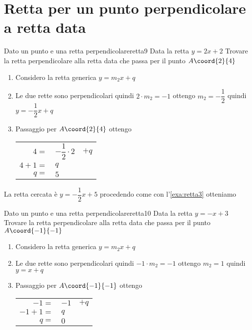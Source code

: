 \section{Retta per un punto perpendicolare a retta data}
\begin{esempiot}{Dato un punto e una retta perpendicolare}{retta9}
	Data la retta $y=2x+2$ Trovare la retta perpendicolare alla retta data che  passa per il punto	$A\coord{2}{4}$
\end{esempiot}
\begin{enumerate}
	\item Considero la retta generica $y=m_2x+q$
	\item Le due rette sono perpendicolari quindi $2\cdot m_2=-1$ ottengo $m_2=-\dfrac{1}{2}$ quindi $y=-\dfrac{1}{2}x+q$
	\item Passaggio per $A\coord{2}{4}$ ottengo 
	\begin{tabular}{rll}
		$4=$&$-\dfrac{1}{2}\cdot 2$&$+q$\\
		$4+1=$&$q$\\
		$q=$&$5$\\
	\end{tabular}
\end{enumerate}

La retta cercata è $y=-\dfrac{1}{2}x+5$ procedendo come con l'\cref{exa:retta3}
otteniamo
\begin{center}
	
	\label{fig:disegnoretta9}
\end{center}
\begin{esempiot}{Dato un punto e una retta perpendicolare}{retta10}
	Data la retta $y=-x+3$ Trovare la retta perpendicolare alla retta data che  passa per il punto	$A\coord{-1}{-1}$
\end{esempiot}
\begin{enumerate}
	\item Considero la retta generica $y=m_2x+q$
	\item Le due rette sono perpendicolari quindi $-1\cdot m_2=-1$ ottengo $m_2=1$ quindi $y=x+q$
	\item Passaggio per $A\coord{-1}{-1}$ ottengo 
	\begin{tabular}{rll}
		$-1=$&$-1$&$+q$\\
		$-1+1=$&$q$\\
		$q=$&$0$\\
	\end{tabular}
\end{enumerate}

